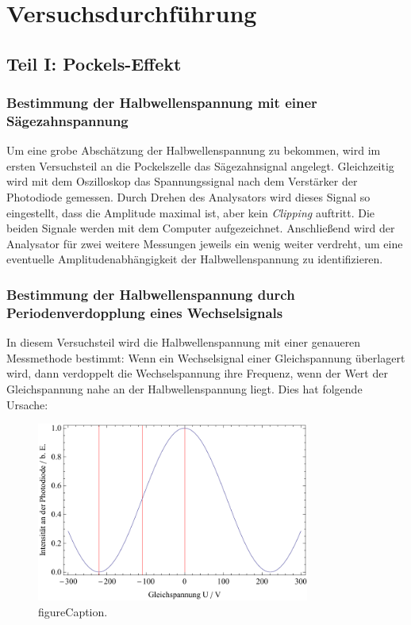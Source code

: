 \section{Versuchsdurchführung}
\subsection{Teil I: Pockels-Effekt}
\subsubsection{Bestimmung der Halbwellenspannung mit einer Sägezahnspannung}
Um eine grobe Abschätzung der Halbwellenspannung zu bekommen,
wird im ersten Versuchsteil an die Pockelszelle das Sägezahnsignal angelegt.
Gleichzeitig wird mit dem Oszilloskop das Spannungssignal nach dem Verstärker der Photodiode gemessen.
Durch Drehen des Analysators wird dieses Signal so eingestellt,
dass die Amplitude maximal ist, aber kein \emph{Clipping} auftritt.
Die beiden Signale werden mit dem Computer aufgezeichnet.
Anschließend wird der Analysator für zwei weitere Messungen jeweils ein wenig weiter verdreht,
um eine eventuelle Amplitudenabhängigkeit der Halbwellenspannung zu identifizieren. 


\subsubsection{Bestimmung der Halbwellenspannung durch Periodenverdopplung eines Wechselsignals}

In diesem Versuchsteil wird die Halbwellenspannung mit einer genaueren Messmethode bestimmt:
Wenn ein Wechselsignal einer Gleichspannung überlagert wird,
dann verdoppelt die Wechselspannung ihre Frequenz,
wenn der Wert der Gleichspannung nahe an der Halbwellenspannung liegt.
Dies hat folgende Ursache:

\begin{figure}[H]
\begin{center}
  \includegraphics[width=0.8\textwidth]{../img/Pocktheo1.pdf}
  \caption{figureCaption.}
  \label{img:pocktheo1}
\end{center}
\end{figure}

